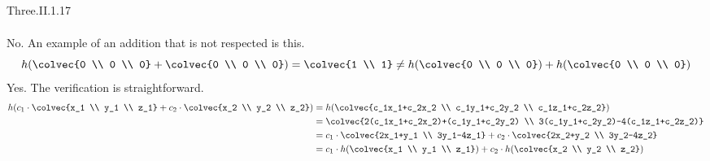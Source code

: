 \begin{ans}{Three.II.1.17}
\begin{exparts}
\begin{align*}
          \end{align*}
        \partsitem No.
          An example of an addition that is not respected is this.
          \begin{equation*}
            h(\colvec{0 \\ 0 \\ 0}+\colvec{0 \\ 0 \\ 0})
            =\colvec{1 \\ 1}
            \neq h(\colvec{0 \\ 0 \\ 0})+h(\colvec{0 \\ 0 \\ 0})
          \end{equation*}
        \partsitem Yes.
           The verification is straightforward.
          \begin{align*}
            h( c_1\cdot\colvec{x_1 \\ y_1 \\ z_1}
               +c_2\cdot\colvec{x_2 \\ y_2 \\ z_2} )
            &=h( \colvec{c_1x_1+c_2x_2 \\ c_1y_1+c_2y_2 \\ c_1z_1+c_2z_2} ) \\
            &=\colvec{2(c_1x_1+c_2x_2)+(c_1y_1+c_2y_2) \\
                      3(c_1y_1+c_2y_2)-4(c_1z_1+c_2z_2)}          \\
            &=c_1\cdot\colvec{2x_1+y_1 \\ 3y_1-4z_1}
               +c_2\cdot\colvec{2x_2+y_2 \\ 3y_2-4z_2}            \\
            &=c_1\cdot h(\colvec{x_1 \\ y_1 \\ z_1})
               +c_2\cdot h(\colvec{x_2 \\ y_2 \\ z_2})
          \end{align*}
      \end{exparts}
    
\end{ans}
